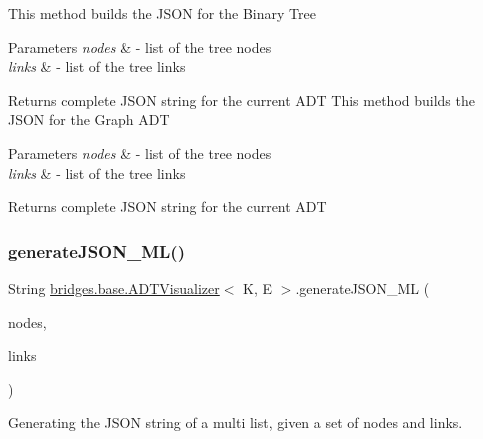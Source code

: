 This method builds the J\+S\+ON for the Binary Tree 
\begin{DoxyParams}{Parameters}
{\em nodes} & -\/ list of the tree nodes \\
\hline
{\em links} & -\/ list of the tree links \\
\hline
\end{DoxyParams}
\begin{DoxyReturn}{Returns}
complete J\+S\+ON string for the current A\+DT This method builds the J\+S\+ON for the Graph A\+DT 
\end{DoxyReturn}

\begin{DoxyParams}{Parameters}
{\em nodes} & -\/ list of the tree nodes \\
\hline
{\em links} & -\/ list of the tree links \\
\hline
\end{DoxyParams}
\begin{DoxyReturn}{Returns}
complete J\+S\+ON string for the current A\+DT 
\end{DoxyReturn}
\hypertarget{classbridges_1_1base_1_1_a_d_t_visualizer_a5c65bf6d0132b8cab58dd1038e48fa79}{}\label{classbridges_1_1base_1_1_a_d_t_visualizer_a5c65bf6d0132b8cab58dd1038e48fa79} 
\subsubsection{\texorpdfstring{generate\+J\+S\+O\+N\+\_\+\+M\+L()}{generateJSON\_ML()}}
{\footnotesize\ttfamily String \hyperlink{classbridges_1_1base_1_1_a_d_t_visualizer}{bridges.\+base.\+A\+D\+T\+Visualizer}$<$ K, E $>$.generate\+J\+S\+O\+N\+\_\+\+ML (\begin{DoxyParamCaption}\item[{Linked\+List$<$ \hyperlink{classbridges_1_1base_1_1_m_lelement}{M\+Lelement}$<$ E $>$$>$}]{nodes,  }\item[{Linked\+List$<$ \hyperlink{classbridges_1_1base_1_1_m_lelement}{M\+Lelement}$<$ E $>$$>$}]{links }\end{DoxyParamCaption})}

Generating the J\+S\+ON string of a multi list, given a set of nodes and links.


